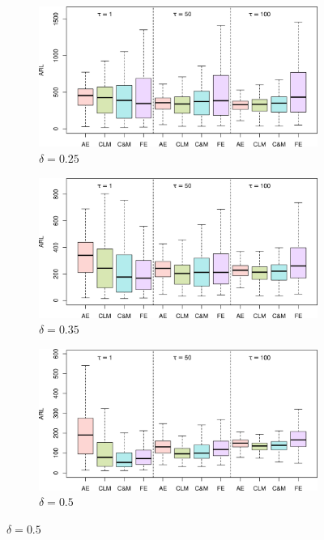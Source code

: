 \begin{figure}
\centering
\begin{subfigure}{0.49\textwidth}
  \centering
  \caption{$ \delta = 0.25$}
  \label{fig:lambda=0.125/theta=4.0/delta=0.25}
  \includegraphics[width=\textwidth]{img/sims/theta=4.0_signedEWMA(l = 0.125, upw = true, L = 1.0)/delta=0.25.png}
\end{subfigure}
\begin{subfigure}{0.49\textwidth}
  \centering
  \caption{$ \delta = 0.35$}
  \label{fig:lambda=0.125/theta=4.0/delta=0.35}
  \includegraphics[width=\textwidth]{img/sims/theta=4.0_signedEWMA(l = 0.125, upw = true, L = 1.0)/delta=0.35.png}
\end{subfigure}
\begin{subfigure}{0.49\textwidth}
  \centering
  \caption{$ \delta = 0.5$}
  \label{fig:lambda=0.125/theta=4.0/delta=0.5}
  \includegraphics[width=\textwidth]{img/sims/theta=4.0_signedEWMA(l = 0.125, upw = true, L = 1.0)/delta=0.50.png}

\end{subfigure}
\end{figure}
